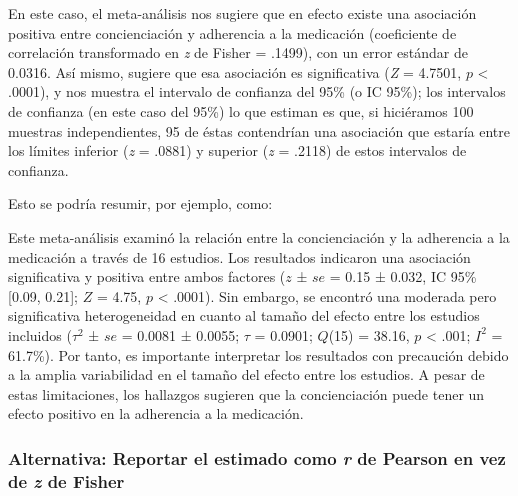 \documentclass[
  bookmarksnumbered]{article}
\begin{document}
En este caso, el meta-análisis nos sugiere que en efecto existe una asociación positiva entre concienciación y adherencia a la medicación (coeficiente de correlación transformado en \emph{z} de Fisher = .1499), con un error estándar de 0.0316. Así mismo, sugiere que esa asociación es significativa (\emph{Z} = 4.7501, \(p\) \textless{} .0001), y nos muestra el intervalo de confianza del 95\% (o IC 95\%); los intervalos de confianza (en este caso del 95\%) lo que estiman es que, si hiciéramos 100 muestras independientes, 95 de éstas contendrían una asociación que estaría entre los límites inferior (\emph{z} = .0881) y superior (\emph{z} = .2118) de estos intervalos de confianza.

Esto se podría resumir, por ejemplo, como:

\begin{tcolorbox}[enhanced,attach boxed title to top center={yshift=-3mm,yshifttext=-1mm},
  colback=iacol!5!white,colframe=iacol!75!white,colbacktitle=iacol,
  title=Ejemplo de reporte básico,fonttitle=\bfseries,
  boxed title style={size=small,colframe=iacol} ]
  
Este meta-análisis examinó la relación entre la concienciación y la adherencia a la medicación a través de 16 estudios. Los resultados indicaron una asociación significativa y positiva entre ambos factores ($z$ ± $se$ = 0.15 ± 0.032, IC 95\% [0.09, 0.21]; $Z$ = 4.75, $p$ < .0001). Sin embargo, se encontró una moderada pero significativa heterogeneidad en cuanto al tamaño del efecto entre los estudios incluidos ($\tau^2$ ± $se$ =  0.0081 ± 0.0055; $\tau$ = 0.0901; $Q$(15) =  38.16, $p$ < .001; $I^2$ = 61.7\%). Por tanto, es importante interpretar los resultados con precaución debido a la amplia variabilidad en el tamaño del efecto entre los estudios. A pesar de estas limitaciones, los hallazgos sugieren que la concienciación puede tener un efecto positivo en la adherencia a la medicación.

\end{tcolorbox}

\hypertarget{alternativa-reportar-el-estimado-como-r-de-pearson-en-vez-de-z-de-fisher}{%
\subsubsection{\texorpdfstring{Alternativa: Reportar el estimado como \emph{r} de Pearson en vez de \emph{z} de Fisher}{Alternativa: Reportar el estimado como r de Pearson en vez de z de Fisher}}\label{alternativa-reportar-el-estimado-como-r-de-pearson-en-vez-de-z-de-fisher}}
\end{document}
